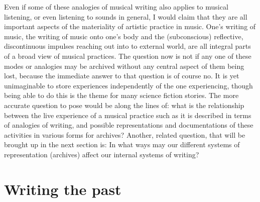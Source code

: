 \documentclass[11pt,a4paper]{article}
\begin{document}
Even if some of these analogies of musical writing also applies to musical listening, or even listening to sounds in general, I would claim that they are all important aspects of the materiality of artistic practice in music. One's writing of music, the writing of music onto one's body and the (subconscious) reflective, discontinuous impulses reaching out into to external world, are all integral parts of a broad view of musical practices. The question now is not if any one of these modes or analogies may be archived without any central aspect of them being lost, because the immediate answer to that question is of course no. It is yet unimaginable to store experiences independently of the one experiencing, though being able to do this is the theme for many science fiction stories. The more accurate question to pose would be along the lines of: what is the relationship between the live experience of a musical practice such as it is described in terms of analogies of writing, and possible representations and documentations of these activities in various forms for archives? Another, related question, that will be brought up in the next section is: In what ways may our different systems of representation (archives) affect our internal systems of writing?

\section*{Writing the past}
\label{sec:archive-fever}
\end{document}
